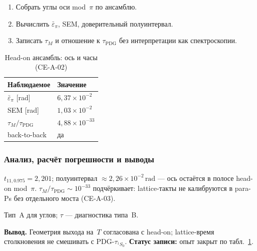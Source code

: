 \begin{enumerate}[label=\textbf{Шаг \arabic*:},leftmargin=*,itemsep=0.35em]
\item Собрать углы оси mod~$\pi$ по ансамблю.
\item Вычислить $\bar\varepsilon_\pi$, SEM, доверительный полуинтервал.
\item Записать $\tau_M$ и отношение к $\tau_{\mathrm{PDG}}$ без интерпретации как спектроскопии.
\end{enumerate}

\begin{table}[htbp]
\centering
\small
\caption{Head-on ансамбль: ось и часы (CE-A-02)}
\label{tab:exp-ce-a-02}
\begin{tabular}{@{}ll@{}}
\toprule
Наблюдаемое & Значение \\
\midrule
$\bar\varepsilon_\pi$ [rad] & $6{,}37\times 10^{-2}$ \\
SEM [rad] & $1{,}03\times 10^{-2}$ \\
$\tau_M/\tau_{\mathrm{PDG}}$ & $4{,}88\times 10^{-33}$ \\
back-to-back & да \\
\bottomrule
\end{tabular}
\end{table}

\subsubsection*{Анализ, расчёт погрешности и выводы}
$t_{11,0.975}=2{,}201$; полуинтервал $\approx 2{,}26\times 10^{-2}\,\mathrm{rad}$ --- ось остаётся в полосе head-on mod~$\pi$.
$\tau_M/\tau_{\mathrm{PDG}}\sim 10^{-33}$ подчёркивает: lattice-такты не калибруются в para-Ps без отдельного моста (CE-A-03).

Тип~A для углов; $\tau$ --- диагностика типа~B.

\textbf{Вывод.}
Геометрия выхода на~$T$ согласована с head-on; lattice-время столкновения не смешивать с PDG-$\tau_{^1S_0}$.
\textbf{Статус записи:} опыт закрыт по табл.~\ref{tab:exp-ce-a-02}.

